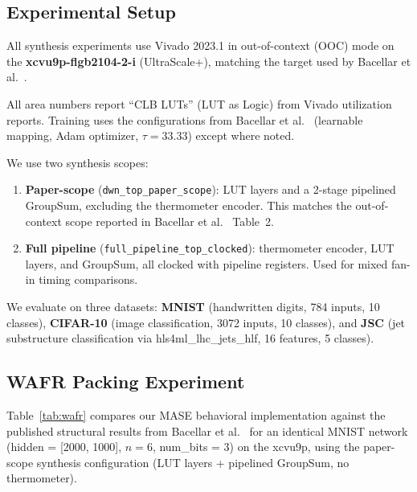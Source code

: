 \documentclass[conference]{IEEEtran}
\begin{document}
\subsection{Experimental Setup}

All synthesis experiments use Vivado 2023.1 in out-of-context (OOC) mode on the \textbf{xcvu9p-flgb2104-2-i} (UltraScale+), matching the target used by Bacellar et al.~\cite{bacellar2024dwn}.

\noindent All area numbers report ``CLB LUTs'' (LUT as Logic) from Vivado utilization reports.
Training uses the configurations from Bacellar et al.~\cite{bacellar2024dwn} (learnable mapping, Adam optimizer, $\tau = 33.33$) except where noted.

We use two synthesis scopes:
\begin{enumerate}
    \item \textbf{Paper-scope} (\texttt{dwn\_top\_paper\_scope}): LUT layers and a 2-stage pipelined GroupSum, excluding the thermometer encoder. This matches the out-of-context scope reported in Bacellar et al.~\cite{bacellar2024dwn} Table~2.
    \item \textbf{Full pipeline} (\texttt{full\_pipeline\_top\_clocked}): thermometer encoder, LUT layers, and GroupSum, all clocked with pipeline registers. Used for mixed fan-in timing comparisons.
\end{enumerate}

We evaluate on three datasets:
\textbf{MNIST} (handwritten digits, 784 inputs, 10 classes),
\textbf{CIFAR-10} (image classification, 3072 inputs, 10 classes),
and \textbf{JSC} (jet substructure classification via hls4ml\_lhc\_jets\_hlf, 16 features, 5 classes).


\subsection{WAFR Packing Experiment}
\label{sec:wafr}

Table~\ref{tab:wafr} compares our MASE behavioral implementation against the published structural results from Bacellar et al.~\cite{bacellar2024dwn} for an identical MNIST network (hidden = [2000, 1000], $n = 6$, num\_bits = 3) on the xcvu9p, using the paper-scope synthesis configuration (LUT layers + pipelined GroupSum, no thermometer).
\end{document}
